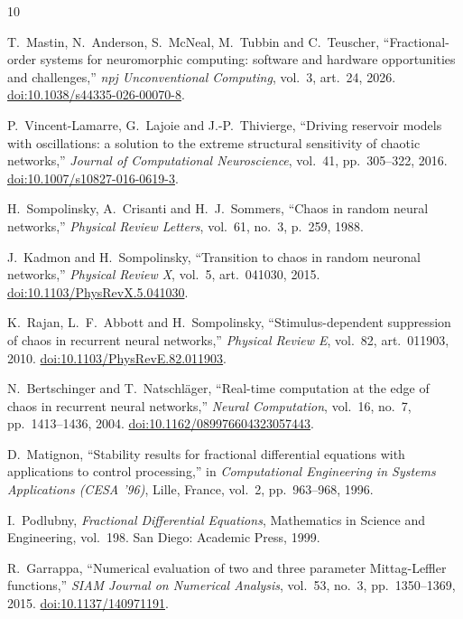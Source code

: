 \documentclass[11pt,a4paper]{article}
\begin{document}
\begin{thebibliography}{10}

T.~Mastin, N.~Anderson, S.~McNeal, M.~Tubbin and C.~Teuscher,
``Fractional-order systems for neuromorphic computing: software and hardware opportunities and challenges,''
\emph{npj Unconventional Computing}, vol.~3, art.~24, 2026.
\href{https://doi.org/10.1038/s44335-026-00070-8}{doi:10.1038/s44335-026-00070-8}.

P.~Vincent-Lamarre, G.~Lajoie and J.-P.~Thivierge,
``Driving reservoir models with oscillations: a solution to the extreme structural sensitivity of chaotic networks,''
\emph{Journal of Computational Neuroscience}, vol.~41, pp.~305--322, 2016.
\href{https://doi.org/10.1007/s10827-016-0619-3}{doi:10.1007/s10827-016-0619-3}.

H.~Sompolinsky, A.~Crisanti and H.~J.~Sommers,
``Chaos in random neural networks,''
\emph{Physical Review Letters}, vol.~61, no.~3, p.~259, 1988.

J.~Kadmon and H.~Sompolinsky,
``Transition to chaos in random neuronal networks,''
\emph{Physical Review X}, vol.~5, art.~041030, 2015.
\href{https://doi.org/10.1103/PhysRevX.5.041030}{doi:10.1103/PhysRevX.5.041030}.

K.~Rajan, L.~F.~Abbott and H.~Sompolinsky,
``Stimulus-dependent suppression of chaos in recurrent neural networks,''
\emph{Physical Review E}, vol.~82, art.~011903, 2010.
\href{https://doi.org/10.1103/PhysRevE.82.011903}{doi:10.1103/PhysRevE.82.011903}.

N.~Bertschinger and T.~Natschl\"ager,
``Real-time computation at the edge of chaos in recurrent neural networks,''
\emph{Neural Computation}, vol.~16, no.~7, pp.~1413--1436, 2004.
\href{https://doi.org/10.1162/089976604323057443}{doi:10.1162/089976604323057443}.

D.~Matignon,
``Stability results for fractional differential equations with applications to control processing,''
in \emph{Computational Engineering in Systems Applications (CESA '96)}, Lille, France, vol.~2, pp.~963--968, 1996.

I.~Podlubny,
\emph{Fractional Differential Equations},
Mathematics in Science and Engineering, vol.~198. San Diego: Academic Press, 1999.

R.~Garrappa,
``Numerical evaluation of two and three parameter Mittag-Leffler functions,''
\emph{SIAM Journal on Numerical Analysis}, vol.~53, no.~3, pp.~1350--1369, 2015.
\href{https://doi.org/10.1137/140971191}{doi:10.1137/140971191}.


\end{thebibliography}
\end{document}

